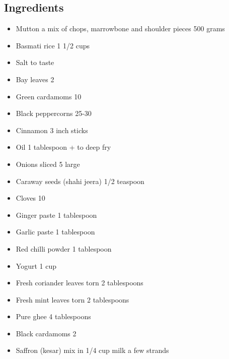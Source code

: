 \documentclass{article}
\begin{document}
        \subsection{Ingredients}
            \begin{itemize}
                \item Mutton a mix of chops, marrowbone and shoulder pieces 500 grams
                \item Basmati rice 1 1/2 cups
                \item Salt to taste
                \item Bay leaves 2
                \item Green cardamoms 10
                \item Black peppercorns 25-30
                \item Cinnamon 3 inch sticks
                \item Oil 1 tablespoon + to deep fry
                \item Onions sliced 5 large
                \item Caraway seeds (shahi jeera) 1/2 teaspoon
                \item Cloves 10
                \item Ginger paste 1 tablespoon
                \item Garlic paste 1 tablespoon
                \item Red chilli powder 1 tablespoon
                \item Yogurt 1 cup
                \item Fresh coriander leaves torn 2 tablespoons
                \item Fresh mint leaves torn 2 tablespoons
                \item Pure ghee 4 tablespoons
                \item Black cardamoms 2
                \item Saffron (kesar) mix in 1/4 cup milk a few strands 
            \end{itemize}
              
\end{document}
